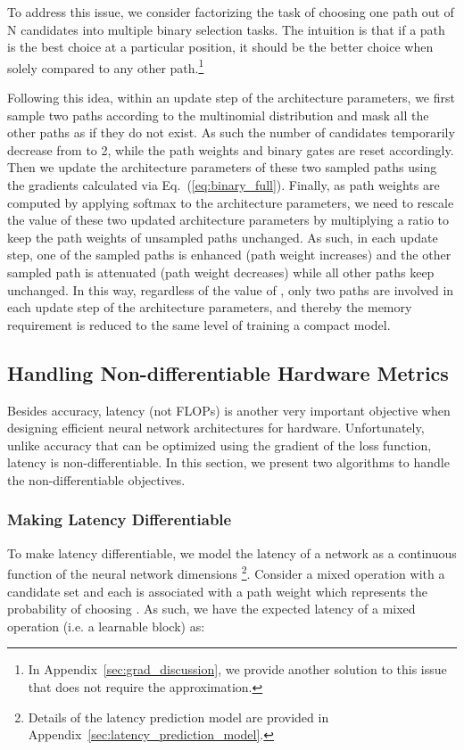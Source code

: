 \documentclass{article} \usepackage{iclr2019_conference,times}
\begin{document}
To address this issue, we consider factorizing the task of choosing one path out of N candidates into multiple binary selection tasks. The intuition is that if a path is the best choice at a particular position, it should be the better choice when solely compared to any other path.\footnote{In Appendix~\ref{sec:grad_discussion}, we provide another solution to this issue that does not require the approximation.}

Following this idea, within an update step of the architecture parameters, we first sample two paths according to the multinomial distribution  and mask all the other paths as if they do not exist. As such the number of candidates temporarily decrease from  to 2, while the path weights  and binary gates  are reset accordingly. Then we update the architecture parameters of these two sampled paths using the gradients calculated via Eq.~(\ref{eq:binary_full}). Finally, as path weights are computed by applying softmax to the architecture parameters, we need to rescale the value of these two updated architecture parameters by multiplying a ratio to keep the path weights of unsampled paths unchanged. As such, in each update step, one of the sampled paths is enhanced (path weight increases) and the other sampled path is attenuated (path weight decreases) while all other paths keep unchanged. In this way, regardless of the value of , only two paths are involved in each update step of the architecture parameters, and thereby the memory requirement is reduced to the same level of training a compact model.

\subsection{Handling Non-differentiable Hardware Metrics}
Besides accuracy, latency (not FLOPs) is another very important objective when designing efficient neural network architectures for hardware. Unfortunately, unlike accuracy that can be optimized using the gradient of the loss function, latency is non-differentiable. In this section, we present two algorithms to handle the non-differentiable objectives. 

\subsubsection{Making Latency Differentiable}
To make latency differentiable, we model the latency of a network as a continuous function of the neural network dimensions \footnote{Details of the latency prediction model are provided in Appendix~\ref{sec:latency_prediction_model}.}. Consider a mixed operation with a candidate set  and each  is associated with a path weight  which represents the probability of choosing . As such, we have the expected latency of a mixed operation (i.e. a learnable block) as:
\end{document}
